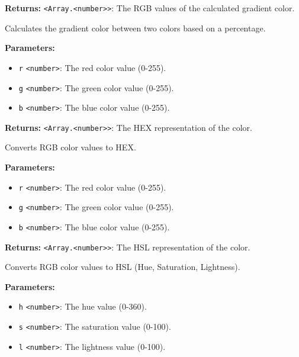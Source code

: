 \documentclass[12pt,a4paper]{article}
\begin{document}
\noindent \textbf{Returns:} \texttt{<Array.<number>>}: The RGB values of the calculated gradient color.

\noindent Calculates the gradient color between two colors based on a percentage.

\vspace{5mm}
\noindent {}


\noindent \textbf{Parameters:}
\begin{itemize}
  \item \texttt{r} \texttt{<number>}: The red color value (0-255).
  \item \texttt{g} \texttt{<number>}: The green color value (0-255).
  \item \texttt{b} \texttt{<number>}: The blue color value (0-255).
\end{itemize}

\noindent \textbf{Returns:} \texttt{<Array.<number>>}: The HEX representation of the color.

\noindent Converts RGB color values to HEX.

\vspace{5mm}
\noindent {}


\noindent \textbf{Parameters:}
\begin{itemize}
  \item \texttt{r} \texttt{<number>}: The red color value (0-255).
  \item \texttt{g} \texttt{<number>}: The green color value (0-255).
  \item \texttt{b} \texttt{<number>}: The blue color value (0-255).
\end{itemize}

\noindent \textbf{Returns:} \texttt{<Array.<number>>}: The HSL representation of the color.

\noindent Converts RGB color values to HSL (Hue, Saturation, Lightness).

\vspace{5mm}
\noindent {}


\noindent \textbf{Parameters:}
\begin{itemize}
  \item \texttt{h} \texttt{<number>}: The hue value (0-360).
  \item \texttt{s} \texttt{<number>}: The saturation value (0-100).
  \item \texttt{l} \texttt{<number>}: The lightness value (0-100).
\end{itemize}
\end{document}
